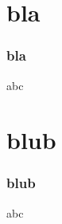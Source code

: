 \documentclass{beamer}
\begin{document}
\section{bla}
\begin{frame}
\frametitle{bla}
    abc
\end{frame}

\section{blub}
\begin{frame}
\frametitle{blub}
    abc
\end{frame}     
\end{document}

